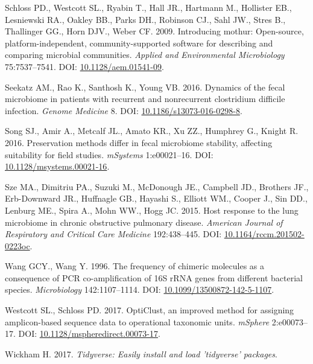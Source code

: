 \documentclass[12pt,]{article}
\begin{document}
\hypertarget{ref-mothur_schloss_2009}{}
Schloss PD., Westcott SL., Ryabin T., Hall JR., Hartmann M., Hollister
EB., Lesniewski RA., Oakley BB., Parks DH., Robinson CJ., Sahl JW.,
Stres B., Thallinger GG., Horn DJV., Weber CF. 2009. Introducing mothur:
Open-source, platform-independent, community-supported software for
describing and comparing microbial communities. \emph{Applied and
Environmental Microbiology} 75:7537--7541. DOI:
\href{https://doi.org/10.1128/aem.01541-09}{10.1128/aem.01541-09}.

\hypertarget{ref-erin_seekatz_2016}{}
Seekatz AM., Rao K., Santhosh K., Young VB. 2016. Dynamics of the fecal
microbiome in patients with recurrent and nonrecurrent clostridium
difficile infection. \emph{Genome Medicine} 8. DOI:
\href{https://doi.org/10.1186/s13073-016-0298-8}{10.1186/s13073-016-0298-8}.

\hypertarget{ref-preservation_Song_2016}{}
Song SJ., Amir A., Metcalf JL., Amato KR., Xu ZZ., Humphrey G., Knight
R. 2016. Preservation methods differ in fecal microbiome stability,
affecting suitability for field studies. \emph{mSystems} 1:e00021--16.
DOI:
\href{https://doi.org/10.1128/msystems.00021-16}{10.1128/msystems.00021-16}.

\hypertarget{ref-Sze2015}{}
Sze MA., Dimitriu PA., Suzuki M., McDonough JE., Campbell JD., Brothers
JF., Erb-Downward JR., Huffnagle GB., Hayashi S., Elliott WM., Cooper
J., Sin DD., Lenburg ME., Spira A., Mohn WW., Hogg JC. 2015. Host
response to the lung microbiome in chronic obstructive pulmonary
disease. \emph{American Journal of Respiratory and Critical Care
Medicine} 192:438--445. DOI:
\href{https://doi.org/10.1164/rccm.201502-0223oc}{10.1164/rccm.201502-0223oc}.

\hypertarget{ref-Wang1996}{}
Wang GCY., Wang Y. 1996. The frequency of chimeric molecules as a
consequence of PCR co-amplification of 16S rRNA genes from different
bacterial species. \emph{Microbiology} 142:1107--1114. DOI:
\href{https://doi.org/10.1099/13500872-142-5-1107}{10.1099/13500872-142-5-1107}.

\hypertarget{ref-opticlust_Westcott_2017}{}
Westcott SL., Schloss PD. 2017. OptiClust, an improved method for
assigning amplicon-based sequence data to operational taxonomic units.
\emph{mSphere} 2:e00073--17. DOI:
\href{https://doi.org/10.1128/mspheredirect.00073-17}{10.1128/mspheredirect.00073-17}.

\hypertarget{ref-tidyverse_2017}{}
Wickham H. 2017. \emph{Tidyverse: Easily install and load 'tidyverse'
packages}.
\end{document}
